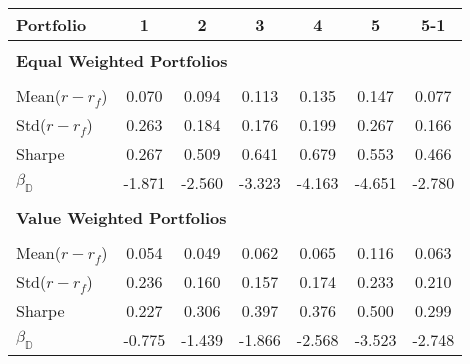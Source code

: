 \begin{tabular}{lcccccc}
\toprule 
 Portfolio & 1 & 2 & 3 & 4 & 5 & 5-1 \\ 
\hline \\[-1.8ex] 
\multicolumn{7}{l}{\textbf{Equal Weighted Portfolios}} \\ 
\hline \\[-1.8ex] 
Mean($r - r_f$) & 0.070 & 0.094 & 0.113  & 0.135  & 0.147 & 0.077 \\ 
Std($r - r_f$) & 0.263 & 0.184 & 0.176  & 0.199  & 0.267 & 0.166 \\ 
Sharpe & 0.267 & 0.509 & 0.641  & 0.679  & 0.553 & 0.466 \\ 
$\beta_\mathbb{D}$ & -1.871 & -2.560 & -3.323  & -4.163  & -4.651 & -2.780 \\ 
\hline \\[-1.8ex] 
\multicolumn{7}{l}{\textbf{Value Weighted Portfolios}} \\ 
\hline \\[-1.8ex] 
Mean($r - r_f$) & 0.054 & 0.049 & 0.062  & 0.065  & 0.116 & 0.063 \\ 
Std($r - r_f$) & 0.236 & 0.160 & 0.157  & 0.174  & 0.233 & 0.210 \\ 
Sharpe & 0.227 & 0.306 & 0.397  & 0.376  & 0.500 & 0.299 \\ 
$\beta_\mathbb{D}$ & -0.775 & -1.439 & -1.866  & -2.568  & -3.523 & -2.748 \\ 
\bottomrule 
\end{tabular}